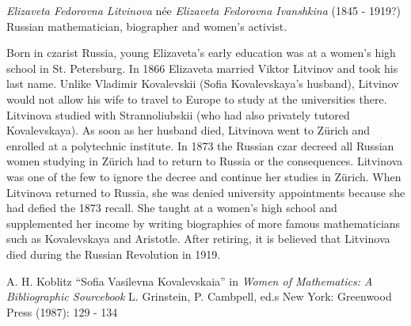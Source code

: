 \documentclass[12pt]{article}
\begin{document}
\emph{Elizaveta Fedorovna Litvinova} n\'ee \emph{Elizaveta Fedorovna Ivanshkina} (1845 - 1919?) Russian mathematician, biographer and women's  activist.

Born in czarist Russia, young Elizaveta's early education was at a women's high school in St. Petersburg. In 1866 Elizaveta married Viktor Litvinov and took his last name. Unlike Vladimir Kovalevskii (Sofia Kovalevskaya's husband), Litvinov would not allow his wife to travel to Europe to study at the universities there. Litvinova studied with Strannoliubskii (who had also privately tutored Kovalevskaya). As soon as her husband died, Litvinova went to Z\"urich and enrolled at a polytechnic institute. In 1873 the Russian czar decreed all Russian women studying in Z\"urich had to return to Russia or  the consequences. Litvinova was one of the few to ignore the decree and continue her studies in Z\"urich. When Litvinova returned to Russia, she was denied university appointments because she had defied the 1873 recall. She taught at a women's high school and supplemented her  income by writing biographies of more famous mathematicians such as Kovalevskaya and Aristotle. After retiring, it is believed that Litvinova died during the Russian Revolution in 1919.

\begin{thebibliography}{1}
 A. H. Koblitz ``Sofia Vasilevna Kovalevskaia'' in {\it Women of Mathematics: A Bibliographic Sourcebook} L. Grinstein, P. Cambpell, ed.s New York: Greenwood Press (1987): 129 - 134
\end{thebibliography}
\end{document}
